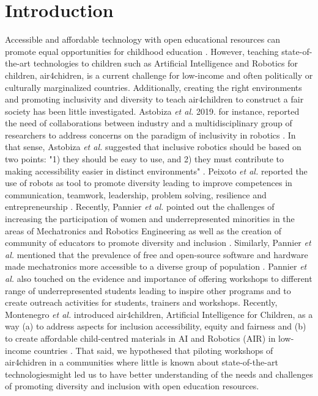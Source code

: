 \documentclass[conference]{IEEEtran}
\newcommand{\etal}{\textit{et al. }} %
\begin{document}
\section{Introduction}
Accessible and affordable technology with open educational resources can promote equal opportunities for childhood education \cite{yoshie2021-unesco}.
However, teaching state-of-the-art technologies to children such as Artificial Intelligence and Robotics for children, air4chidren, is a current challenge for low-income and often politically or culturally marginalized countries.
Additionally, creating the right environments and promoting inclusivity and diversity to teach air4children to construct a fair society has been little investigated. 
Astobiza \etal 2019. for instance, reported the need of collaborations between industry and a multidisciplinary group of researchers to address concerns on the paradigm of inclusivity in robotics \cite{MonasterioAstobiza2019}.
In that sense, Astobiza \etal suggested that inclusive robotics should be based on two points: "1) they should be easy to use, and 2) they must contribute to making accessibility easier in distinct environments" \cite{MonasterioAstobiza2019}.
Peixoto \etal reported the use of robots as tool to promote diversity leading to improve competences in communication, teamwork, leadership, problem solving, resilience and entrepreneurship \cite{PeixotoCastro2018, PeixotoGonzalez2018}. 
Recently, Pannier \etal pointed out the challenges of increasing the  participation of women and underrepresented minorities in the areas of Mechatronics and Robotics Engineering as well as the creation of community of educators to promote diversity and inclusion \cite{Pannier2020}.
Similarly, Pannier \etal mentioned that the prevalence of free and open-source software and hardware made mechatronics more accessible to a diverse group of population \cite{Pannier2020}.
Pannier \etal also touched on the evidence and importance of offering workshops to different range of underrepresented students leading to inspire other programs and to create outreach activities for students, trainers and workshops. 
Recently, Montenegro \etal introduced air4children, Artificial Intelligence for Children, as a way (a) to address aspects for inclusion accessibility, equity and fairness and (b) to create affordable child-centred materials in AI and Robotics (AIR) in low-income countries \cite{montenegro2021air4children}. 
That said, we hypothesed that piloting workshops of air4chidren in a communities where little is known about state-of-the-art technologiesmight led us to have better understanding of the needs and challenges of promoting diversity and inclusion with open education resources.
\end{document}
